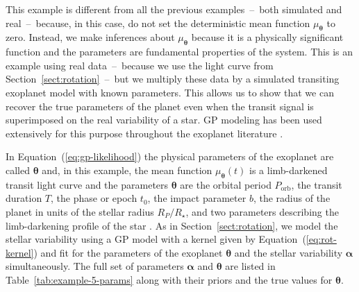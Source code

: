 \documentclass[manuscript, letterpaper]{aastex6}
\renewcommand{\eqref}[1]{\ref{eq:#1}}
\newcommand{\Eq}[1]{Equation~(\eqref{#1})}
\newcommand{\eq}[1]{\Eq{#1}}
\newcommand{\sectionname}{Section}
\newcommand{\sectref}[1]{\ref{sect:#1}}
\newcommand{\Sect}[1]{\sectionname~\sectref{#1}}
\newcommand{\sect}[1]{\Sect{#1}}
\newcommand{\bvec}[1]{{\ensuremath{\boldsymbol{#1}}}}
\newcommand{\response}[1]{{\color{blue}#1}}
\begin{document}
\response{
This example is different from all the previous examples~--~both simulated and
real~--~because, in this case, do not set the deterministic
mean function $\mu_\bvec{\theta}$ to zero.
Instead, we make inferences about $\mu_\bvec{\theta}$ because it is a
physically significant function and the parameters are fundamental properties
of the system.
This is an example using real data~--~because we use the light curve from
\sect{rotation}~--~but we multiply these data by a simulated transiting
exoplanet model with known parameters.
This allows us to show that we can recover the true parameters of the planet
even when the transit signal is superimposed on the real variability of a
star.
}
GP modeling has been used extensively for this purpose throughout the
exoplanet literature \citep[for example][]{Dawson:2014, Barclay:2015,
Evans:2015, Foreman-Mackey:2016b, Grunblatt:2016}.

In \eq{gp-likelihood} the physical parameters of the exoplanet are called
$\bvec{\theta}$ and, in this example, the mean function $\mu_\bvec{\theta}(t)$
is a limb-darkened transit light curve \citep{Mandel:2002} and the parameters
$\bvec{\theta}$ are the orbital period $P_\mathrm{orb}$, the transit duration
$T$, the phase or epoch $t_0$, the impact parameter $b$, the radius of the
planet in units of the stellar radius $R_P/R_\star$, and two parameters
describing the limb-darkening profile of the star
\citep{Claret:2011,Kipping:2013}.
As in \sect{rotation}, we model the stellar variability using a GP model
with a kernel given by \eq{rot-kernel} and fit for the parameters of the
exoplanet $\bvec{\theta}$ and the stellar variability $\bvec{\alpha}$
simultaneously.
\response{The full set of parameters $\bvec{\alpha}$ and $\bvec{\theta}$ are
listed in Table~\ref{tab:example-5-params} along with their priors and the
true values for $\bvec{\theta}$.}
\end{document}
